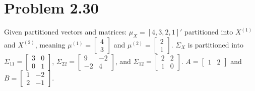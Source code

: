 \documentclass[11pt,letterpaper]{article}
\begin{document}
\section*{Problem 2.30}
Given partitioned vectors and matrices:
$\mu_X = [4, 3, 2, 1]'$ partitioned into $X^{(1)}$ and $X^{(2)}$, meaning $\mu^{(1)} = \begin{bmatrix} 4 \\ 3 \end{bmatrix}$ and $\mu^{(2)} = \begin{bmatrix} 2 \\ 1 \end{bmatrix}$. 
$\Sigma_X$ is partitioned into $\Sigma_{11} = \begin{bmatrix} 3 & 0 \\ 0 & 1 \end{bmatrix}$, $\Sigma_{22} = \begin{bmatrix} 9 & -2 \\ -2 & 4 \end{bmatrix}$, and $\Sigma_{12} = \begin{bmatrix} 2 & 2 \\ 1 & 0 \end{bmatrix}$.
$A = \begin{bmatrix} 1 & 2 \end{bmatrix}$ and $B = \begin{bmatrix} 1 & -2 \\ 2 & -1 \end{bmatrix}$.
\end{document}
